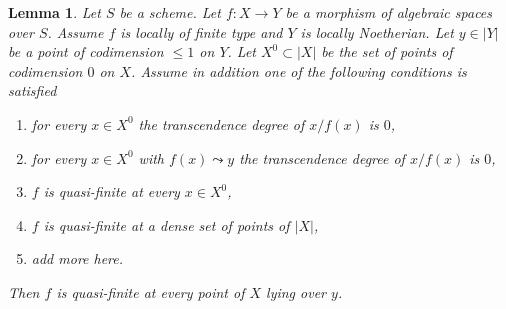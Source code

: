 \documentclass{stacks-project}
\theoremstyle{plain}
\newtheorem{lemma}[subsection]{Lemma}
\theoremstyle{definition}
\theoremstyle{remark}
\numberwithin{equation}{subsection}
\begin{document}
\begin{lemma}
\label{lemma-quasi-finite-in-codim-1}
Let $S$ be a scheme. Let $f : X \to Y$ be a morphism of algebraic spaces
over $S$. Assume $f$ is locally of finite type and $Y$ is locally Noetherian.
Let $y \in |Y|$ be a point of codimension $\leq 1$ on $Y$.
Let $X^0 \subset |X|$ be the set of points of codimension $0$ on $X$.
Assume in addition one of the following conditions is satisfied
\begin{enumerate}
\item for every $x \in X^0$ the transcendence degree of $x/f(x)$ is $0$,
\item for every $x \in X^0$ with $f(x) \leadsto y$
the transcendence degree of $x/f(x)$ is $0$,
\item $f$ is quasi-finite at every $x \in X^0$,
\item $f$ is quasi-finite at a dense set of points of $|X|$,
\item add more here.
\end{enumerate}
Then $f$ is quasi-finite at every point of $X$ lying over $y$.
\end{lemma}
\end{document}
